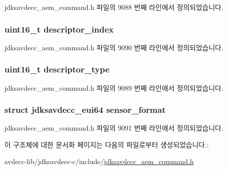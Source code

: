 jdksavdecc\+\_\+aem\+\_\+command.\+h 파일의 9088 번째 라인에서 정의되었습니다.

\subsubsection[{\texorpdfstring{descriptor\+\_\+index}{descriptor_index}}]{\setlength{\rightskip}{0pt plus 5cm}uint16\+\_\+t descriptor\+\_\+index}\hypertarget{structjdksavdecc__aem__command__set__sensor__format_a042bbc76d835b82d27c1932431ee38d4}{}\label{structjdksavdecc__aem__command__set__sensor__format_a042bbc76d835b82d27c1932431ee38d4}


jdksavdecc\+\_\+aem\+\_\+command.\+h 파일의 9090 번째 라인에서 정의되었습니다.

\subsubsection[{\texorpdfstring{descriptor\+\_\+type}{descriptor_type}}]{\setlength{\rightskip}{0pt plus 5cm}uint16\+\_\+t descriptor\+\_\+type}\hypertarget{structjdksavdecc__aem__command__set__sensor__format_ab7c32b6c7131c13d4ea3b7ee2f09b78d}{}\label{structjdksavdecc__aem__command__set__sensor__format_ab7c32b6c7131c13d4ea3b7ee2f09b78d}


jdksavdecc\+\_\+aem\+\_\+command.\+h 파일의 9089 번째 라인에서 정의되었습니다.

\subsubsection[{\texorpdfstring{sensor\+\_\+format}{sensor_format}}]{\setlength{\rightskip}{0pt plus 5cm}struct {\bf jdksavdecc\+\_\+eui64} sensor\+\_\+format}\hypertarget{structjdksavdecc__aem__command__set__sensor__format_a100aa7be90c95e113ca53584ab78094a}{}\label{structjdksavdecc__aem__command__set__sensor__format_a100aa7be90c95e113ca53584ab78094a}


jdksavdecc\+\_\+aem\+\_\+command.\+h 파일의 9091 번째 라인에서 정의되었습니다.



이 구조체에 대한 문서화 페이지는 다음의 파일로부터 생성되었습니다.\+:\begin{DoxyCompactItemize}
\item 
avdecc-\/lib/jdksavdecc-\/c/include/\hyperlink{jdksavdecc__aem__command_8h}{jdksavdecc\+\_\+aem\+\_\+command.\+h}\end{DoxyCompactItemize}
